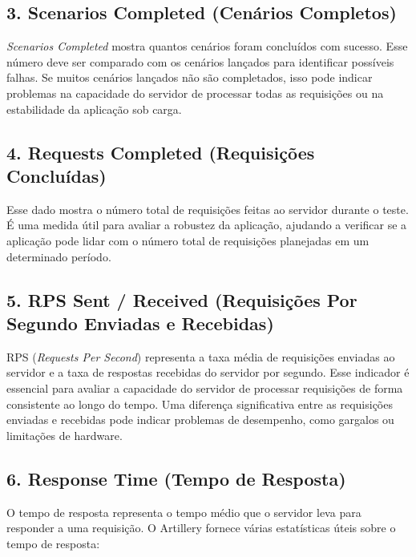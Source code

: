 \subsection{3. Scenarios Completed (Cenários Completos)}

\textit{Scenarios Completed} mostra quantos cenários foram concluídos com sucesso. Esse número deve ser comparado com os cenários lançados para identificar possíveis falhas. Se muitos cenários lançados não são completados, isso pode indicar problemas na capacidade do servidor de processar todas as requisições ou na estabilidade da aplicação sob carga.

\subsection{4. Requests Completed (Requisições Concluídas)}

Esse dado mostra o número total de requisições feitas ao servidor durante o teste. É uma medida útil para avaliar a robustez da aplicação, ajudando a verificar se a aplicação pode lidar com o número total de requisições planejadas em um determinado período.

\subsection{5. RPS Sent / Received (Requisições Por Segundo Enviadas e Recebidas)}

RPS (\textit{Requests Per Second}) representa a taxa média de requisições enviadas ao servidor e a taxa de respostas recebidas do servidor por segundo. Esse indicador é essencial para avaliar a capacidade do servidor de processar requisições de forma consistente ao longo do tempo. Uma diferença significativa entre as requisições enviadas e recebidas pode indicar problemas de desempenho, como gargalos ou limitações de hardware.

\subsection{6. Response Time (Tempo de Resposta)}

O tempo de resposta representa o tempo médio que o servidor leva para responder a uma requisição. O Artillery fornece várias estatísticas úteis sobre o tempo de resposta:

